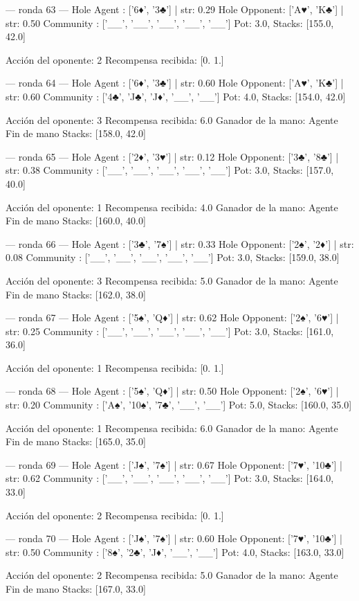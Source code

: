 --- ronda 63 ---
Hole Agent : ['6♦', '3♣'] | str: 0.29
Hole Opponent: ['A♥', 'K♣'] | str: 0.50
Community  : ['__', '__', '__', '__', '__']
Pot: 3.0, Stacks: [155.0, 42.0]

Acción del oponente: 2
Recompensa recibida: [0. 1.]

--- ronda 64 ---
Hole Agent : ['6♦', '3♣'] | str: 0.60
Hole Opponent: ['A♥', 'K♣'] | str: 0.60
Community  : ['4♣', 'J♣', 'J♦', '__', '__']
Pot: 4.0, Stacks: [154.0, 42.0]

Acción del oponente: 3
Recompensa recibida: 6.0
Ganador de la mano: Agente
Fin de mano Stacks: [158.0, 42.0]


--- ronda 65 ---
Hole Agent : ['2♦', '3♥'] | str: 0.12
Hole Opponent: ['3♣', '8♣'] | str: 0.38
Community  : ['__', '__', '__', '__', '__']
Pot: 3.0, Stacks: [157.0, 40.0]

Acción del oponente: 1
Recompensa recibida: 4.0
Ganador de la mano: Agente
Fin de mano Stacks: [160.0, 40.0]


--- ronda 66 ---
Hole Agent : ['3♣', '7♠'] | str: 0.33
Hole Opponent: ['2♠', '2♦'] | str: 0.08
Community  : ['__', '__', '__', '__', '__']
Pot: 3.0, Stacks: [159.0, 38.0]

Acción del oponente: 3
Recompensa recibida: 5.0
Ganador de la mano: Agente
Fin de mano Stacks: [162.0, 38.0]


--- ronda 67 ---
Hole Agent : ['5♠', 'Q♦'] | str: 0.62
Hole Opponent: ['2♠', '6♥'] | str: 0.25
Community  : ['__', '__', '__', '__', '__']
Pot: 3.0, Stacks: [161.0, 36.0]

Acción del oponente: 1
Recompensa recibida: [0. 1.]

--- ronda 68 ---
Hole Agent : ['5♠', 'Q♦'] | str: 0.50
Hole Opponent: ['2♠', '6♥'] | str: 0.20
Community  : ['A♠', '10♠', '7♣', '__', '__']
Pot: 5.0, Stacks: [160.0, 35.0]

Acción del oponente: 1
Recompensa recibida: 6.0
Ganador de la mano: Agente
Fin de mano Stacks: [165.0, 35.0]


--- ronda 69 ---
Hole Agent : ['J♠', '7♠'] | str: 0.67
Hole Opponent: ['7♥', '10♣'] | str: 0.62
Community  : ['__', '__', '__', '__', '__']
Pot: 3.0, Stacks: [164.0, 33.0]

Acción del oponente: 2
Recompensa recibida: [0. 1.]

--- ronda 70 ---
Hole Agent : ['J♠', '7♠'] | str: 0.60
Hole Opponent: ['7♥', '10♣'] | str: 0.50
Community  : ['8♠', '2♣', 'J♦', '__', '__']
Pot: 4.0, Stacks: [163.0, 33.0]

Acción del oponente: 2
Recompensa recibida: 5.0
Ganador de la mano: Agente
Fin de mano Stacks: [167.0, 33.0]


